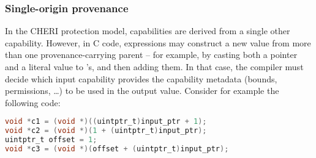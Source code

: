 \documentclass[12pt,twoside,openright,usletter]{article}
\newcommand{\ccode}[1]{{\small\ttfamily{#1}}}
\newcommand{\cintptrt}{{\ccode{intptr\_t}}\xspace}
\newcommand{\note}[2]{{\color{blue}[ Note: #1 - #2]}}
\renewcommand{\note}[2]{\relax\ifhmode\unskip\fi}
\newcommand{\amnote}[1]{\note{#1}{Alfredo M.}}
\newcommand{\psnote}[1]{\note{#1}{Peter S.}}
\begin{document}
\amnote{Should we mention code that assumes that it is ok to go out of bounds
for optimization purposes? E.g., strcmp loading a word at a time?}
\psnote{yes}

\subsubsection{Single-origin provenance}
\label{sec:ambiguous-provenance}

In the CHERI protection model, capabilities are derived from a single other
capability.
However, in C code, expressions may construct a new \cintptrt value from more
than one provenance-carrying parent \cintptrt{} -- for example, by casting both a
pointer and a literal value to \cintptrt{}'s, and then adding them.
\psnote{That literal value wouldn't have a non-empty provenance, so this isn't the best example.   Maybe better to have something like \texttt{p+(q1-q2)} ?}
\psnote{More generally, there is a bit of a mismatch between this and our C provenance treatment of \cintptrt, which there is a plain integer type with no provenance -- but which regains provenance in some cases when cast back to a pointer.  To ponder...}
In that case, the compiler must decide which input capability provides the
capability metadata (bounds, permissions, \ldots{}) to be used in the output
value.
Consider for example the following code:
\begin{lstlisting}[language=C]
void *c1 = (void *)((uintptr_t)input_ptr + 1);
void *c2 = (void *)(1 + (uintptr_t)input_ptr);
uintptr_t offset = 1;
void *c3 = (void *)(offset + (uintptr_t)input_ptr);
\end{lstlisting}
\end{document}
